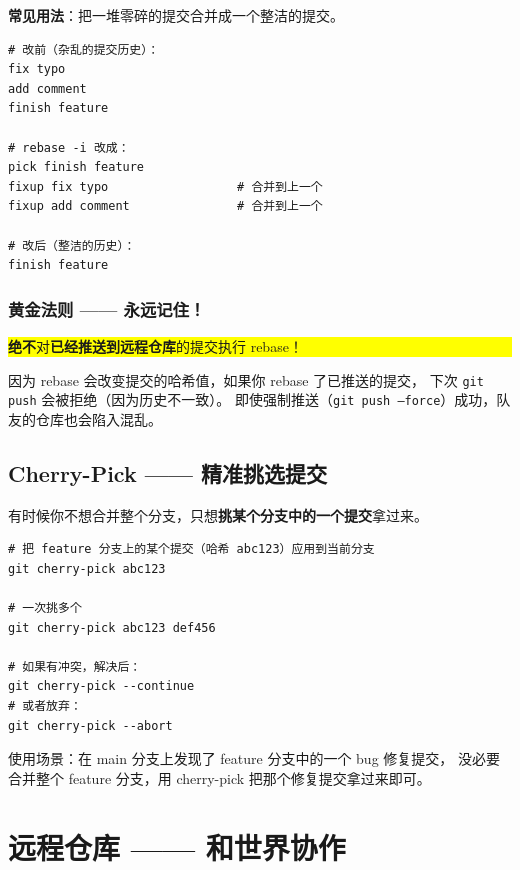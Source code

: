 \documentclass[12pt,a4paper]{article}
\begin{document}
\textbf{常见用法}：把一堆零碎的提交合并成一个整洁的提交。

\begin{lstlisting}[numbers=none]
# 改前（杂乱的提交历史）：
fix typo
add comment
finish feature

# rebase -i 改成：
pick finish feature
fixup fix typo                  # 合并到上一个
fixup add comment               # 合并到上一个

# 改后（整洁的历史）：
finish feature
\end{lstlisting}

\subsubsection{黄金法则 —— 永远记住！}

\begin{center}
\colorbox{yellow}{\parbox{0.9\textwidth}{\centering
\textbf{绝不}对\textbf{已经推送到远程仓库}的提交执行 rebase！
}}
\end{center}

因为 rebase 会改变提交的哈希值，如果你 rebase 了已推送的提交，
下次 \texttt{git push} 会被拒绝（因为历史不一致）。
即使强制推送（\texttt{git push --force}）成功，队友的仓库也会陷入混乱。

\subsection{Cherry-Pick —— 精准挑选提交}

有时候你不想合并整个分支，只想\textbf{挑某个分支中的一个提交}拿过来。

\begin{lstlisting}
# 把 feature 分支上的某个提交（哈希 abc123）应用到当前分支
git cherry-pick abc123

# 一次挑多个
git cherry-pick abc123 def456

# 如果有冲突，解决后：
git cherry-pick --continue
# 或者放弃：
git cherry-pick --abort
\end{lstlisting}

使用场景：在 main 分支上发现了 feature 分支中的一个 bug 修复提交，
没必要合并整个 feature 分支，用 cherry-pick 把那个修复提交拿过来即可。

\section{远程仓库 —— 和世界协作}
\end{document}
